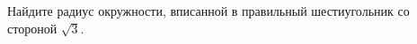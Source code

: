 \begin{ex}
	\begin{condition}
		Найдите радиус окружности, вписанной в правильный шестиугольник со стороной  \( \sqrt{3} \).
	\end{condition}
\end{ex}